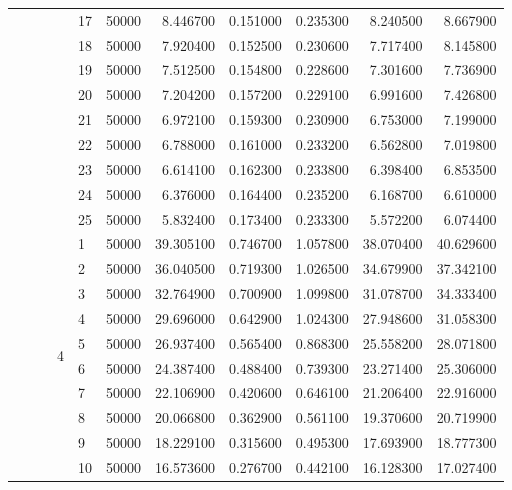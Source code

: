 \begin{tabular}{llllllrrrrr}
\cline{5-11}
 &  &  &  & 17 & 50000 & 8.446700 & 0.151000 & 0.235300 & 8.240500 & 8.667900 \\
\cline{5-11}
 &  &  &  & 18 & 50000 & 7.920400 & 0.152500 & 0.230600 & 7.717400 & 8.145800 \\
\cline{5-11}
 &  &  &  & 19 & 50000 & 7.512500 & 0.154800 & 0.228600 & 7.301600 & 7.736900 \\
\cline{5-11}
 &  &  &  & 20 & 50000 & 7.204200 & 0.157200 & 0.229100 & 6.991600 & 7.426800 \\
\cline{5-11}
 &  &  &  & 21 & 50000 & 6.972100 & 0.159300 & 0.230900 & 6.753000 & 7.199000 \\
\cline{5-11}
 &  &  &  & 22 & 50000 & 6.788000 & 0.161000 & 0.233200 & 6.562800 & 7.019800 \\
\cline{5-11}
 &  &  &  & 23 & 50000 & 6.614100 & 0.162300 & 0.233800 & 6.398400 & 6.853500 \\
\cline{5-11}
 &  &  &  & 24 & 50000 & 6.376000 & 0.164400 & 0.235200 & 6.168700 & 6.610000 \\
\cline{5-11}
 &  &  &  & 25 & 50000 & 5.832400 & 0.173400 & 0.233300 & 5.572200 & 6.074400 \\
\cline{4-11} \cline{5-11}
 &  &  & \multirow[t]{25}{*}{4} & 1 & 50000 & 39.305100 & 0.746700 & 1.057800 & 38.070400 & 40.629600 \\
\cline{5-11}
 &  &  &  & 2 & 50000 & 36.040500 & 0.719300 & 1.026500 & 34.679900 & 37.342100 \\
\cline{5-11}
 &  &  &  & 3 & 50000 & 32.764900 & 0.700900 & 1.099800 & 31.078700 & 34.333400 \\
\cline{5-11}
 &  &  &  & 4 & 50000 & 29.696000 & 0.642900 & 1.024300 & 27.948600 & 31.058300 \\
\cline{5-11}
 &  &  &  & 5 & 50000 & 26.937400 & 0.565400 & 0.868300 & 25.558200 & 28.071800 \\
\cline{5-11}
 &  &  &  & 6 & 50000 & 24.387400 & 0.488400 & 0.739300 & 23.271400 & 25.306000 \\
\cline{5-11}
 &  &  &  & 7 & 50000 & 22.106900 & 0.420600 & 0.646100 & 21.206400 & 22.916000 \\
\cline{5-11}
 &  &  &  & 8 & 50000 & 20.066800 & 0.362900 & 0.561100 & 19.370600 & 20.719900 \\
\cline{5-11}
 &  &  &  & 9 & 50000 & 18.229100 & 0.315600 & 0.495300 & 17.693900 & 18.777300 \\
\cline{5-11}
 &  &  &  & 10 & 50000 & 16.573600 & 0.276700 & 0.442100 & 16.128300 & 17.027400 \\

\end{tabular}
